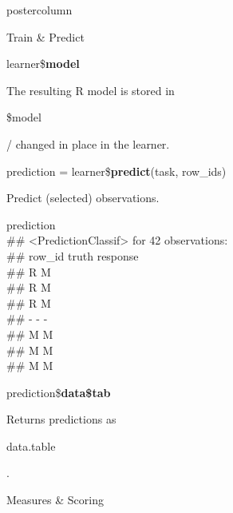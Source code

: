 \documentclass{beamer}
\newcommand{\codeinline}[1]{\begin{codeboxinline}#1\end{codeboxinline}}
\begin{document}
\begin{frame}[fragile]{}
\begin{columns}
\begin{column}{.245\textwidth}
\begin{beamercolorbox}[center]{postercolumn}
\begin{minipage}{.98\textwidth}
{\begin{myblock}{Train \& Predict}
							\begin{codebox}
								learner\$\textbf{model}
							\end{codebox}
							The resulting R model is stored in \codeinline{\$model}/ changed in place in the learner.
							\\
							\vspace{1em} %
							\begin{codebox}
								prediction = learner\$\textbf{predict}(task, row\_ids)
							\end{codebox}
	                        Predict (selected) observations.
	                        \\
	                        \begin{codeboxmultiline}[width=23cm]
								{\footnotesize prediction\\
								\#\# <PredictionClassif> for 42 observations:\\
								\#\# row\_id truth response\\
								\#\# \space\space\space\space\space 2
								\space\space\space\space R \space\space\space\space\space\space\space M\\
								\#\# \space\space\space\space\space 3
								\space\space\space\space R \space\space\space\space\space\space\space M\\
								\#\# \space\space\space\space\space 5
								\space\space\space\space R \space\space\space\space\space\space\space M\\
								\#\# - - -\\
								\#\# \space\space\space 198
								\space\space\space\space M \space\space\space\space\space\space\space M\\
								\#\# \space\space{}00
								\space\space\space\space M \space\space\space\space\space\space\space M\\
								\#\# \space\space\space 207
								\space\space\space\space M \space\space\space\space\space\space\space M}
	                        \end{codeboxmultiline}
							\vspace{1em}
							\begin{codebox}
								prediction\$\textbf{data\$tab}
							\end{codebox}
							Returns predictions as \codeinline{data.table}.
	                    \end{myblock}
	                    \begin{myblock}{Measures \& Scoring}
							\begin{codebox}

\end{codebox}
\end{myblock}}
\end{minipage}
\end{beamercolorbox}
\end{column}
\end{columns}
\end{frame}
\end{document}
